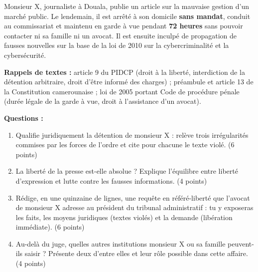 \documentclass[11pt]{article}
\begin{document}
\begin{exercice}
Monsieur X, journaliste à Douala, publie un article sur la mauvaise gestion d'un marché public. Le lendemain, il est arrêté à son domicile \textbf{sans mandat}, conduit au commissariat et maintenu en garde à vue pendant \textbf{72 heures} sans pouvoir contacter ni sa famille ni un avocat. Il est ensuite inculpé de \og propagation de fausses nouvelles \fg{} sur la base de la loi de 2010 sur la cybercriminalité et la cybersécurité.

\textbf{Rappels de textes :} article 9 du PIDCP (droit à la liberté, interdiction de la détention arbitraire, droit d'être informé des charges) ; préambule et article 13 de la Constitution camerounaise ; loi de 2005 portant Code de procédure pénale (durée légale de la garde à vue, droit à l'assistance d'un avocat).

\textbf{Questions :}
\begin{enumerate}
\item Qualifie juridiquement la détention de monsieur X : relève trois irrégularités commises par les forces de l'ordre et cite pour chacune le texte violé. (6 points)
\item La liberté de la presse est-elle absolue ? Explique l'équilibre entre liberté d'expression et lutte contre les fausses informations. (4 points)
\item Rédige, en une quinzaine de lignes, une requête en référé-liberté que l'avocat de monsieur X adresse au président du tribunal administratif : tu y exposeras les faits, les moyens juridiques (textes violés) et la demande (libération immédiate). (6 points)
\item Au-delà du juge, quelles autres institutions monsieur X ou sa famille peuvent-ils saisir ? Présente deux d'entre elles et leur rôle possible dans cette affaire. (4 points)
\end{enumerate}
\end{exercice}
\end{document}
